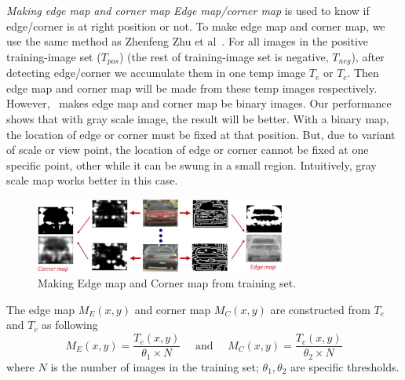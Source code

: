 \textit{Making edge map and corner map }
\textit{Edge map/corner map} is used to know if edge/corner is at right
position or not. To make edge map and corner map, we use the same
method as Zhenfeng Zhu et al~\cite{zhu2004car}. For all images in the positive
training-image set ($T_{pos}$) (the rest of training-image set is negative,
$T_{neg}$), after detecting edge/corner we accumulate them in one temp
image $T_{e}$ or $T_{c}$. Then edge map and corner map will be made from
these temp images respectively. However,~\cite{zhu2004car} makes edge map and
corner map be binary images. Our performance shows that with gray
scale image, the result will be better. With a binary map, the location
of edge or corner must be fixed at that position. But, due to variant
of scale or view point, the location of edge or corner cannot be fixed
at one specific point, other while it can be swung in a small region.
Intuitively, gray scale map works better in this case.
\begin{figure}[ht]
  \centering
  \includegraphics[width=3.25in]{images/edgemap_cornermap.jpg}
  \caption{Making Edge map and Corner map from training set.}
  \label{fig:making_edge_corner_map}
\end{figure}
The edge map $M_{E}(x,y)$ and corner map $M_{C}(x,y)$ are constructed from
$T_{e}$ and $T_{c}$ as following
\begin{equation}
M_E(x,y) = \frac{T_{e}(x,y)}{\theta_1 \times N} \mbox{~~~~and~~~~}
M_C(x,y) = \frac{T_{c}(x,y)}{\theta_2 \times N}
   \label{eq:edge_corner_map}
\end{equation}
where $N$ is the number of images in the training set; $\theta_1, \theta_2$ are
specific thresholds. %
